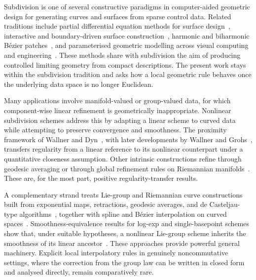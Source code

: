 \documentclass{article}
\theoremstyle{plain}
\theoremstyle{definition}
\begin{document}
Subdivision is one of several constructive paradigms in computer-aided
geometric design for generating curves and surfaces from sparse control data.
Related traditions include partial differential equation methods for surface
design~\cite{BloorWilson89, BloorWilson90}, interactive and boundary-driven
surface construction~\cite{UgailBW99a, UgailBW99b, KubiesaUW04}, harmonic and
biharmonic B\'{e}zier patches~\cite{MonterdeUgail04, MonterdeUgail06}, and
parameterised geometric modelling across visual computing and
engineering~\cite{GonzalezUgail08, AthanasopoulosUgail09, ShengUgail10, ShengUgail11}.
These methods share with subdivision the aim of producing controlled limiting
geometry from compact descriptions. The present work stays within the
subdivision tradition and asks how a local geometric rule behaves once the
underlying data space is no longer Euclidean.

Many applications involve manifold-valued or group-valued data, for which
component-wise linear refinement is geometrically inappropriate. Nonlinear
subdivision schemes address this by adapting a linear scheme to curved data
while attempting to preserve convergence and smoothness. The proximity framework
of Wallner and Dyn~\cite{WallnerDyn05}, with later developments by Wallner and
Grohs~\cite{Wallner06, Grohs10prox, Grohs10stab}, transfers regularity from a
linear reference to its nonlinear counterpart under a quantitative closeness
assumption. Other intrinsic constructions refine through geodesic averaging or
through global refinement rules on Riemannian
manifolds~\cite{DynSharon17a, DynSharon17b, Wallner14, HuningWallner19}. These
are, for the most part, positive regularity-transfer results.

A complementary strand treats Lie-group and Riemannian curve constructions
built from exponential maps, retractions, geodesic averages, and de
Casteljau-type algorithms~\cite{ParkRavani95, CrouchLeite95, CrouchKunLeite99,
NavYazPol13}, together with spline and B\'{e}zier interpolation on curved
spaces~\cite{NoakesHP89, PopielNoakes07}. Smoothness-equivalence results for
log-exp and single-basepoint schemes show that, under suitable hypotheses, a
nonlinear Lie-group scheme inherits the smoothness of its linear
ancestor~\cite{WallnerNYGrohs07, XieYu08, XieYu10, DuchampXieYu13, NavYazYu11}.
These approaches provide powerful general machinery. Explicit local
interpolatory rules in genuinely noncommutative settings, where the correction
from the group law can be written in closed form and analysed directly, remain
comparatively rare.
\end{document}
